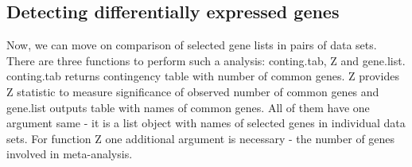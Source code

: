 \documentclass[a4paper]{report}
\begin{document}
\subsection*{Detecting differentially expressed genes}
Now, we can move on comparison of selected gene lists in pairs of data sets. There are three functions to perform such a analysis: {\ttfamily conting.tab}, {\ttfamily Z} and {\ttfamily gene.list}. {\ttfamily conting.tab} returns contingency table with number of common genes. {\ttfamily Z} provides Z statistic to measure significance of observed number of common genes and {\ttfamily gene.list} outputs table with names of common genes. All of them have one argument same - it is a list object with names of selected genes in individual data sets. For function {\ttfamily Z} one additional argument is necessary - the number of genes involved in meta-analysis. 
\end{document}
